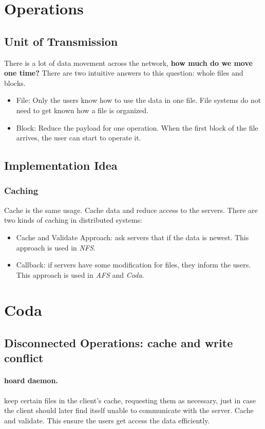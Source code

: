 \section{Operations}

\subsection{Unit of Transmission}
There is a lot of data movement across the network, \textbf{how much do we move one time?} There are two intuitive answers to this question: whole files and blocks.
\begin{itemize}
    \item File: Only the users know how to use the data in one file. File systems do not need to get known how a file is organized.
    \item Block: Reduce the payload for one operation. When the first block of the file arrives, the user can start to operate it.
\end{itemize}

\subsection{Implementation Idea}
\subsubsection{Caching}
Cache is the same usage. Cache data and reduce access to the servers.
There are two kinds of caching in distributed systems:
\begin{itemize}
    \item Cache and Validate Approach: ask servers that if the data is newest. This approach is used in \emph{NFS}.
    \item Callback: if servers have some modification for files, they inform the users. This approach is used in \emph{AFS} and \emph{Coda}.
\end{itemize}

\section{Coda}
\subsection{Disconnected Operations: cache and write conflict}
\paragraph{hoard daemon.} keep certain files in the client's cache, requesting them as necessary, just in case the client should later find itself unable to communicate with the server. Cache and validate. This ensure the users get access the data efficiently.
